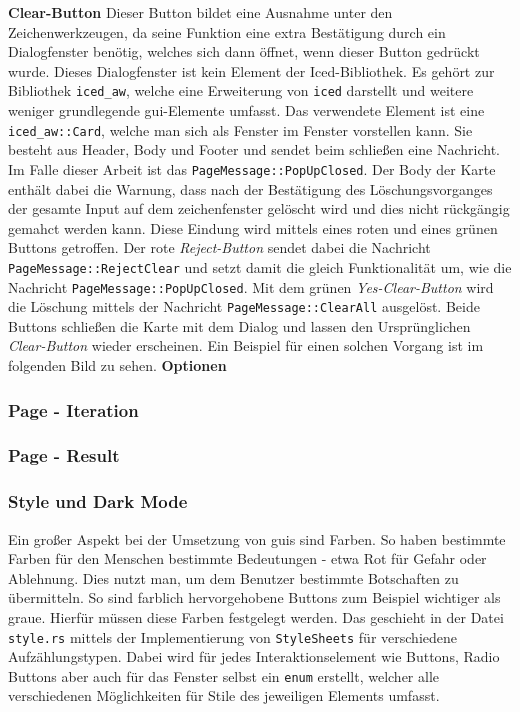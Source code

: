 \textbf{\small{Clear-Button}}\linebreak
Dieser Button bildet eine Ausnahme unter den Zeichenwerkzeugen, da seine Funktion eine extra Bestätigung durch ein Dialogfenster benötig, welches sich dann öffnet, wenn dieser Button gedrückt wurde. 
Dieses Dialogfenster ist kein Element der Iced-Bibliothek. Es gehört zur Bibliothek \lstinline{iced_aw}, welche eine Erweiterung von \lstinline{iced} darstellt und weitere weniger grundlegende \ac{gui}-Elemente umfasst.
Das verwendete Element ist eine \lstinline{iced_aw::Card}, welche man sich als Fenster im Fenster vorstellen kann. Sie besteht aus Header, Body und Footer und sendet beim schließen eine Nachricht. Im Falle dieser Arbeit ist das 
\lstinline{PageMessage::PopUpClosed}. Der Body der Karte enthält dabei die Warnung, dass nach der Bestätigung des Löschungsvorganges der gesamte Input auf dem zeichenfenster gelöscht wird und dies nicht rückgängig gemahct werden kann.
Diese Eindung wird mittels eines roten und eines grünen Buttons getroffen. Der rote \emph{Reject-Button} sendet dabei die Nachricht \lstinline{PageMessage::RejectClear} und setzt damit die gleich Funktionalität um, wie die Nachricht \lstinline{PageMessage::PopUpClosed}.
Mit dem grünen \emph{Yes-Clear-Button} wird die Löschung mittels der Nachricht \lstinline{PageMessage::ClearAll} ausgelöst. Beide Buttons schließen die Karte mit dem Dialog und lassen den Ursprünglichen \emph{Clear-Button} wieder erscheinen. 
Ein Beispiel für einen solchen Vorgang ist im folgenden Bild zu sehen.
\linebreak 
\textbf{Optionen}
\subsubsection{Page - Iteration}
\subsubsection{Page - Result}
\subsubsection{Style und Dark Mode}
Ein großer Aspekt bei der Umsetzung von \ac{gui}s sind Farben. So haben bestimmte Farben für den Menschen bestimmte Bedeutungen - etwa Rot für Gefahr oder Ablehnung.
Dies nutzt man, um dem Benutzer bestimmte Botschaften zu übermitteln. So sind farblich hervorgehobene Buttons zum Beispiel wichtiger als graue. Hierfür müssen diese Farben festgelegt werden.
Das geschieht in der Datei \lstinline{style.rs} mittels der Implementierung von \lstinline{StyleSheets} für verschiedene Aufzählungstypen.
Dabei wird für jedes Interaktionselement wie Buttons, Radio Buttons aber auch für das Fenster selbst ein \lstinline{enum} erstellt, welcher alle verschiedenen Möglichkeiten für Stile des jeweiligen Elements 
umfasst. 

